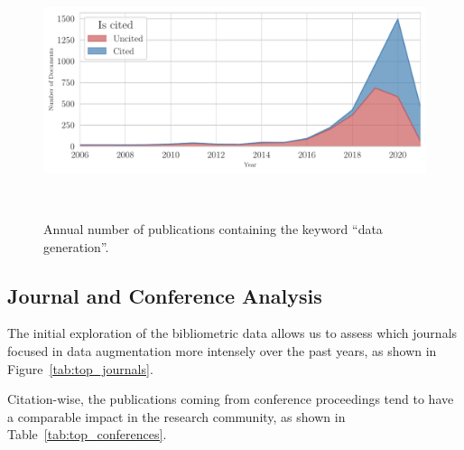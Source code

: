 \documentclass[parskip=full]{scrartcl}
\begin{document}
\begin{figure}[H]
	\centering
    \includegraphics[width=\linewidth]{../analysis/area_chart_cited_documents}
    \caption{Annual number of publications containing the keyword ``data
        generation''.
    }~\label{fig:area_chart_cited_documents}
\end{figure}


\subsection{Journal and Conference Analysis}

The initial exploration of the bibliometric data allows us to assess which
journals focused in data augmentation more intensely over the past years, as
shown in Figure~\ref{tab:top_journals}.

\begin{table}[H]
    \centering
    \vspace{.2cm}
    \caption{\label{tab:top_journals}
        Top journals focusing on data augmentation techniques, sorted by
        citations per document.
    }
\end{table}

Citation-wise, the publications coming from conference proceedings tend to
have a comparable impact in the research community, as shown in
Table~\ref{tab:top_conferences}.
\end{document}
